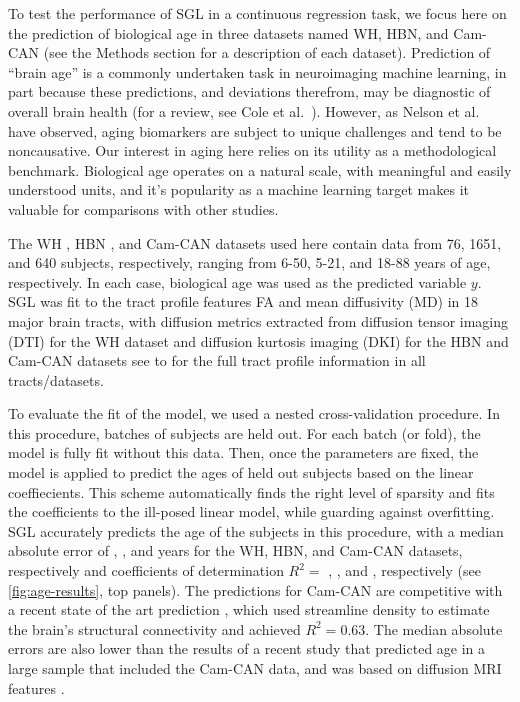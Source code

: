 \documentclass[10pt,letterpaper]{article}
\begin{document}
To test the performance of SGL in a continuous
regression task, we focus here on the prediction of biological age in three
datasets named WH, HBN, and Cam-CAN (see the Methods section for a description of each dataset). Prediction of ``brain
age'' is a commonly undertaken task in neuroimaging machine learning, in part
because these predictions, and deviations therefrom, may be diagnostic of
overall brain health (for a review, see Cole et al.~\cite{Cole2019-rz}).
However, as Nelson et al.~\cite{nelson2019biomarkers} have observed, aging
biomarkers are subject to unique challenges and tend to be noncausative. Our
interest in aging here relies on its utility as a methodological benchmark.
Biological age operates on a natural scale, with meaningful and easily
understood units, and it's popularity as a machine learning target makes it
valuable for comparisons with other studies.

The WH \cite{yeatman2014lifespan}, HBN \cite{alexander2017open}, and Cam-CAN
\cite{shafto2014cambridge,taylor2017cambridge} datasets used here contain
data from 76, 1651, and 640 subjects, respectively, ranging from 6-50, 5-21,
and 18-88 years of age, respectively. In each case, biological age was used
as the predicted variable $y$. SGL was fit to the tract profile
features FA and mean diffusivity (MD) in 18 major brain tracts, with diffusion metrics extracted
from diffusion tensor imaging (DTI) for the WH dataset and diffusion kurtosis
imaging (DKI) \cite{jensen2005diffusion} for the HBN and Cam-CAN datasets
see  to  for the full tract profile information in all tracts/datasets.

To evaluate the fit of the model, we used a nested cross-validation
procedure. In this procedure, batches of subjects are held out. For each
batch (or fold), the model is fully fit without this data. Then, once the
parameters are fixed, the model is applied to predict the ages of held out
subjects based on the linear coeffiecients. This scheme automatically finds
the right level of sparsity and fits the coefficients to the ill-posed linear
model, while guarding against overfitting. SGL accurately predicts the age of
the subjects in this procedure, with a median absolute error of {\whMae},
{\hbnMae}, and {\camcanMae} years for the WH, HBN, and Cam-CAN datasets,
respectively and coefficients of determination $R^2 = $ {\whRsq} , {\hbnRsq}, and {\camcanRsq},
respectively (see \cref{fig:age-results}, top panels). The
predictions for Cam-CAN are competitive with a recent state of the art
prediction \cite{mcpherson2020single}, which used streamline density to
estimate the brain's structural connectivity and achieved $R^2 = 0.63$. The
median absolute errors are also lower than the results of a recent study that
predicted age in a large sample that included the Cam-CAN data, and was based
on diffusion MRI features \cite{Richard2018-ux}.
\end{document}
